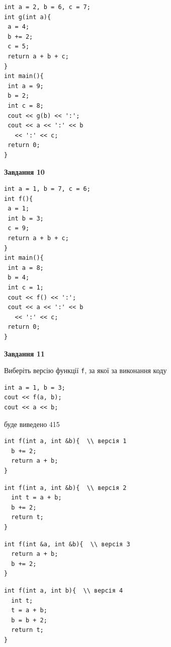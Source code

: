 \documentclass[12pt, ukrainian]{article}
\def\code#1{\Verb!#1!}
\begin{document}
{\begin {large}
\begin{minipage}[t]{7.0cm}
\begin{verbatim}
int a = 2, b = 6, c = 7;
int g(int a){
 a = 4;
 b += 2;
 c = 5;
 return a + b + c;
}
int main(){
 int a = 9;
 b = 2;
 int c = 8;
 cout << g(b) << ':';
 cout << a << ':' << b 
   << ':' << c;
 return 0;
}
\end{verbatim}



\begin{center}
\textbf{Завдання 10}
\end{center}
\vspace{-8mm}

\begin{verbatim}
int a = 1, b = 7, c = 6;
int f(){
 a = 1;
 int b = 3;
 c = 9;
 return a + b + c;
}
int main(){
 int a = 8;
 b = 4;
 int c = 1;
 cout << f() << ':';
 cout << a << ':' << b 
   << ':' << c;
 return 0;
}
\end{verbatim}

\end{minipage}
\vline \hspace{1mm}
\begin{minipage}[t]{11.0cm}

\begin{center}
\textbf{Завдання 11}
\end{center}
Виберіть версію функції \code{f}, за якої за виконання коду
\begin{verbatim}
int a = 1, b = 3;
cout << f(a, b);
cout << a << b;
\end{verbatim}

буде виведено 415

\begin{verbatim}
int f(int a, int &b){  \\ версія 1
  b += 2;
  return a + b;
}
\end{verbatim}

\vspace{-8mm}\begin{verbatim}
int f(int a, int &b){  \\ версія 2
  int t = a + b;
  b += 2;
  return t;
}
\end{verbatim}

\vspace{-8mm}\begin{verbatim}
int f(int &a, int &b){  \\ версія 3
  return a + b;
  b += 2;
}
\end{verbatim}

\vspace{-8mm}\begin{verbatim}
int f(int a, int b){  \\ версія 4
  int t;
  t = a + b;
  b = b + 2;
  return t;
}
\end{verbatim}




\end{minipage}
\end{large}}
\end{document}
